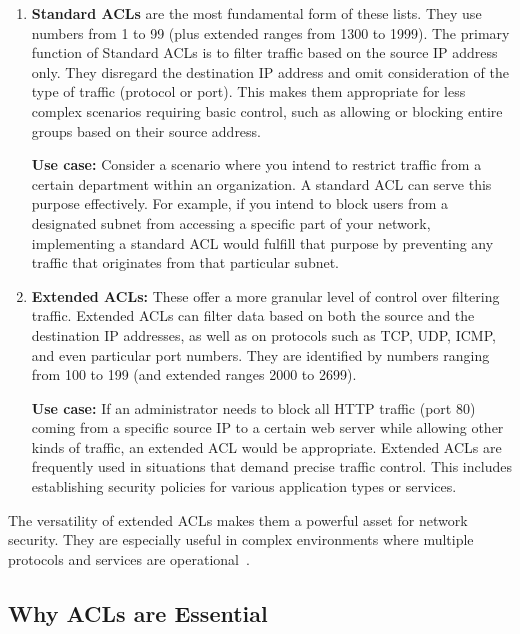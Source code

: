 \documentclass[11pt,a4paper]{article}
\begin{document}
        \begin{enumerate}
            \item \textbf{Standard ACLs} are the most fundamental form of these lists. They use numbers from 1 to 99 (plus extended ranges from 1300 to 1999). The primary function of Standard ACLs is to filter traffic based on the source IP address only. They disregard the destination IP address and omit consideration of the type of traffic (protocol or port). This makes them appropriate for less complex scenarios requiring basic control, such as allowing or blocking entire groups based on their source address.
        
            \textbf{Use case:} Consider a scenario where you intend to restrict traffic from a certain department within an organization. A standard ACL can serve this purpose effectively. For example, if you intend to block users from a designated subnet from accessing a specific part of your network, implementing a standard ACL would fulfill that purpose by preventing any traffic that originates from that particular subnet.

            \item  \textbf{Extended ACLs:} These offer a more granular level of control over filtering traffic. Extended ACLs can filter data based on both the source and the destination IP addresses, as well as on protocols such as TCP, UDP, ICMP, and even particular port numbers. They are identified by numbers ranging from 100 to 199 (and extended ranges 2000 to 2699).
    
            \textbf{Use case:} If an administrator needs to block all HTTP traffic (port 80) coming from a specific source IP to a certain web server while allowing other kinds of traffic, an extended ACL would be appropriate. Extended ACLs are frequently used in situations that demand precise traffic control. This includes establishing security policies for various application types or services.
      
        \end{enumerate}

        The versatility of extended ACLs makes them a powerful asset for network security. They are especially useful in complex environments where multiple protocols and services are operational~\cite{std-ext}.
    

    
    \subsection*{Why ACLs are Essential}
\end{document}
